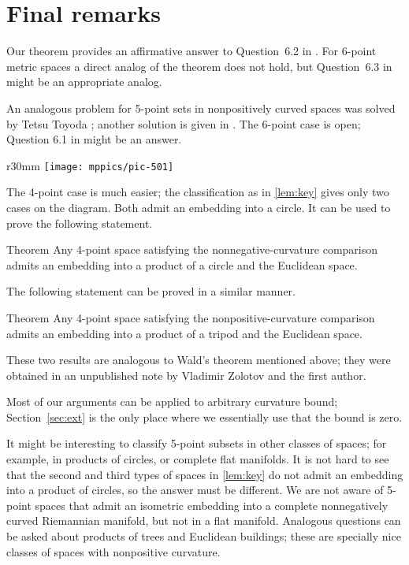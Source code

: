 \documentclass{article}
\begin{document}
\section{Final remarks}

Our theorem provides an affirmative answer to Question~6.2 in \cite{lebedeva-petrunin}.
For 6-point metric spaces a direct analog of the theorem does not hold,
but Question~6.3 in \cite{lebedeva-petrunin} might be an appropriate analog.

An analogous problem for 5-point sets in nonpositively curved spaces was solved by Tetsu Toyoda \cite{toyoda}; another solution is given in \cite{lebedeva-petrunin}.
The 6-point case is open;
Question 6.1 in \cite{lebedeva-petrunin} might be an answer.

{

\begin{wrapfigure}{r}{30mm}
\vskip-6mm
\centering
\texttt{[image: mppics/pic-501]}
\end{wrapfigure}

The 4-point case is much easier;
the classification as in \ref{lem:key} gives only two cases on the diagram.
Both admit an embedding into a circle.
It can be used to prove the following statement.

}

\begin{thm}{Theorem}
Any 4-point space satisfying the nonnegative-curvature comparison
admits an embedding into a product of a circle and the Euclidean space.
\end{thm}

The following statement can be proved in a similar manner.

\begin{thm}{Theorem} Any 4-point space satisfying the nonpositive-curvature comparison admits an embedding into a product of a tripod and the Euclidean space.
\end{thm}

These two results are analogous to Wald's theorem mentioned above;
they were obtained in an unpublished note by Vladimir Zolotov and the first author.

\medskip

Most of our arguments can be applied to arbitrary curvature bound;
Section~\ref{sec:ext} is the only place where we essentially use that the bound is zero.

It might be interesting to classify 5-point subsets in other classes of spaces;
for example, in products of circles, or complete flat manifolds.
It is not hard to see that the second and third types of spaces in \ref{lem:key} do not admit an embedding into a product of circles, so the answer must be different.
We are not aware of 5-point spaces that admit an isometric embedding into a complete nonnegatively curved Riemannian manifold, but not in a flat manifold.
Analogous questions can be asked about products of trees and Euclidean buildings;
these are specially nice classes of spaces with nonpositive curvature.
\end{document}
